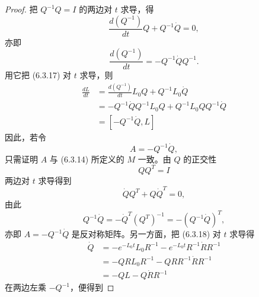 \begin{proof}
把 $Q^{-1}Q=I$ 的两边对 $t$ 求导，得
\begin{equation}
  \frac{d(Q^{-1})}{dt}Q+Q^{-1}\dot{Q}=0,
  \tag{6.3.21}
\end{equation}
亦即
\begin{equation}
  \frac{d(Q^{-1})}{dt}=-Q^{-1}\dot{Q}Q^{-1}.
  \tag{6.3.22}
\end{equation}
用它把 (6.3.17) 对 $t$ 求导，则
\begin{align}
  \frac{dL}{dt}&=\frac{d(Q^{-1})}{dt}L_0Q+Q^{-1}L_0\dot{Q} \tag{6.3.23}\\
  &=-Q^{-1}\dot{Q}Q^{-1}L_0Q+Q^{-1}L_0QQ^{-1}\dot{Q} \tag{6.3.24}\\
  &=\left[-Q^{-1}\dot{Q},L\right] \tag{6.3.25}
\end{align}
因此，若令
\begin{equation}
  A=-Q^{-1}\dot{Q},
  \tag{6.3.26}
\end{equation}
只需证明 $A$ 与 (6.3.14) 所定义的 $M$ 一致。由 $Q$ 的正交性
\begin{equation}
  QQ^T=I
  \tag{6.3.27}
\end{equation}
两边对 $t$ 求导得到
\begin{equation}
  \dot{Q}Q^T+Q\dot{Q}^T=0,
  \tag{6.3.28}
\end{equation}
由此
\begin{equation}
  Q^{-1}\dot{Q}=-\dot{Q}^T(Q^T)^{-1}=-\left(Q^{-1}\dot{Q}\right)^T,
  \tag{6.3.29}
\end{equation}
亦即 $A=-Q^{-1}\dot{Q}$ 是反对称矩阵。另一方面，把 (6.3.18) 对 $t$ 求导得
\begin{align}
  \dot{Q}&=-e^{-L_0t}L_0R^{-1}-e^{-L_0t}R^{-1}\dot{R}R^{-1} \tag{6.3.30}\\
  &=-QRL_0R^{-1}-QRR^{-1}\dot{R}R^{-1} \tag{6.3.31}\\
  &=-QL-Q\dot{R}R^{-1} \tag{6.3.32}
\end{align}
在两边左乘 $-Q^{-1}$，便得到

\ifdefined\UEDAdraft\end{proof}\fi

